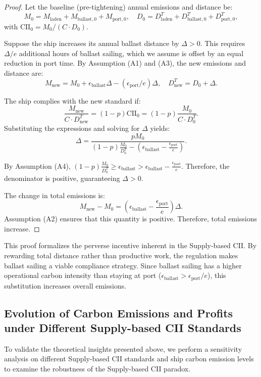 \documentclass[11pt,english]{article}
\begin{document}
\begin{proof}
Let the baseline (pre-tightening) annual emissions and distance be:
\[
M_0 = M_{\text{laden}} + M_{\text{ballast},0} + M_{\text{port},0}, \quad D_0 = D^T_{\text{laden}} + D^T_{\text{ballast},0} + D^T_{\text{port},0},
\]
with $\mathrm{CII}_0 = M_0 / (C \cdot D_0)$. 

Suppose the ship increases its annual ballast distance by $\Delta > 0$. This requires $\Delta / e$ additional hours of ballast sailing, which we assume is offset by an equal reduction in port time. By Assumption (A1) and (A3), the new emissions and distance are:
\[
M_{\text{new}} = M_0 + \epsilon_{\text{ballast}} \Delta - (\epsilon_{\text{port}} / e) \Delta, \quad D^T_{\text{new}} = D_0 + \Delta.
\]

The ship complies with the new standard if:
\[
\frac{M_{\text{new}}}{C \cdot D^T_{\text{new}}} = (1-p)\mathrm{CII}_0=(1-p)\frac{M_0}{C\cdot D_0^T}.
\]
Substituting the expressions and solving for $\Delta$ yields:
\[
\Delta = \frac{p M_0}{(1-p)\frac{M_0}{D_0^T} - \left(\epsilon_{\text{ballast}} - \frac{\epsilon_{\text{port}}}{e}\right)}.
\]

By Assumption (A4), $(1-p)\frac{M_0}{D^T_0} \ge \epsilon_{\text{ballast}} > \epsilon_{\text{ballast}} - \frac{\epsilon_{\text{port}}}{e}$. Therefore, the denominator is positive, guaranteeing $\Delta > 0$.

The change in total emissions is:
\[
M_{\text{new}} - M_0 = \left(\epsilon_{\text{ballast}} - \frac{\epsilon_{\text{port}}}{e}\right) \Delta.
\]
Assumption (A2) ensures that this quantity is positive. Therefore, total emissions increase.
\end{proof}

This proof formalizes the perverse incentive inherent in the Supply-based CII. By rewarding total distance rather than productive work, the regulation makes ballast sailing a viable compliance strategy. Since ballast sailing has a higher operational carbon intensity than staying at port ($\epsilon_{\text{ballast}} > \epsilon_{\text{port}}/e$), this substitution increases overall emissions.

\subsection{Evolution of Carbon Emissions and Profits under Different Supply-based CII Standards}
\label{appendix:supply_cii_exp}

To validate the theoretical insights presented above, we perform a sensitivity analysis on different Supply-based CII standards and ship carbon emission levels to examine the robustness of the Supply-based CII paradox.
\end{document}
